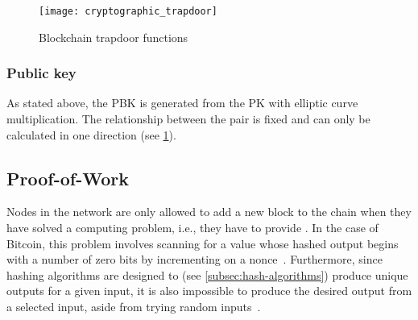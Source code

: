 \begin{figure}[H]
    \caption[Blockchain trapdoor functions]{Blockchain trapdoor functions}
    \label{fig:elliptic-curve-trapdoor}
    \texttt{[image: cryptographic\_trapdoor]}
\end{figure}

\subsubsection{Public key}\label{subsubsec:public-key}

As stated above, the \gls{PBK} is generated from the \gls{PK} with elliptic curve multiplication.
The relationship between the pair is fixed and can only be calculated in one direction (see \cref{fig:elliptic-curve-trapdoor}).



\subsection{Proof-of-Work}\label{subsec:pow}

Nodes in the network are only allowed to add a new block to the chain when they have solved a computing problem, i.e., they have to provide .
In the case of Bitcoin, this problem involves scanning for a value whose hashed output begins with a number of zero bits by incrementing on a nonce~\autocite[3]{nakamoto_bitcoin_2008}.
Furthermore, since hashing algorithms are designed to (see \cref{subsec:hash-algorithms}) produce unique outputs for a given input, it is also impossible to produce the desired output from a selected input, aside from trying random inputs~\autocite[189]{antonopoulos_mastering_2017}.



